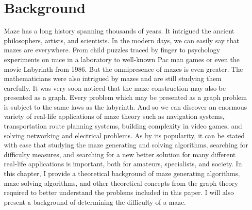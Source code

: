 \chapter{Background}\label{cha:background}

Maze has a long history spanning thousands of years. It intrigued the ancient philosophers, artists, and scientists. In the modern days, we can easily say that mazes are everywhere.
From child puzzles traced by finger to psychology experiments on mice in a laboratory to well-known Pac man games or even the movie Labyrinth from 1986. But the omnipresence of mazes is even greater. 
The mathematicians were also intrigued by mazes and are still studying them carefully. It was very soon noticed that the maze construction may also be presented as a graph. Every problem which may be presented as a graph problem is subject to the same laws as the labyrinth. And so we can discover an enormous variety of real-life applications of maze theory such as navigation systems, transportation route planning systems, building complexity in video games, and solving networking and electrical problems.
As by its popularity, it can be stated with ease that studying the maze generating and solving algorithms, searching for difficulty measures, and searching for a new better solution for many different real-life applications is important, both for amateurs, specialists, and society.  In this chapter, I provide a theoretical background of maze generating algorithms, maze solving algorithms, and other theoretical concepts from the graph theory required to better understand the problems included in this paper. I will also present a background of determining the difficulty of a maze. 


